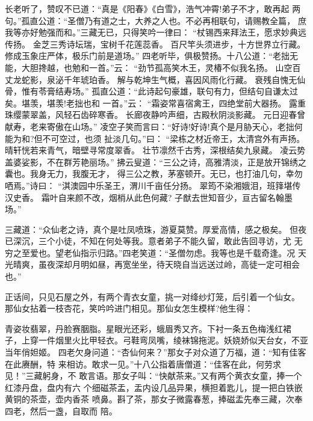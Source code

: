 长老听了，赞叹不已道：“真是《阳春》《白雪》，浩气冲霄!弟子不才，敢再起
两句。”孤直公道：“圣僧乃有道之士，大养之人也。不必再相联句，请赐教全篇，
庶我等亦好勉强而和。”三藏无已，只得笑吟一律曰：
“杖锡西来拜法王，愿求妙典远传扬。
金芝三秀诗坛瑞，宝树千花莲蕊香。
百尺竿头须进步，十方世界立行藏。
修成玉象庄严体，极乐门前是道场。”
四老听毕，俱极赞扬。十八公道：“老拙无能，大胆搀越，也勉和一首。”云：
“劲节孤高笑木王，灵椿不似我名扬。
山空百丈龙蛇影，泉泌千年琥珀香。
解与乾坤生气概，喜因风雨化行藏。
衰残自愧无仙骨，惟有苓膏结寿场。”
孤直公道：“此诗起句豪雄，联句有力，但结句自谦太过矣。堪羡，堪羡!老拙也和
一首。”云：
“霜姿常喜宿禽王，四绝堂前大器扬。
露重珠缨蒙翠盖，风轻石齿碎寒香。
长廊夜静吟声细，古殿秋阴淡影藏。
元日迎春曾献寿，老来寄傲在山场。”
凌空子笑而言曰：“好诗!好诗!真个是月胁天心，老拙何能为和?但不可空过，也须
扯淡几句。”曰：
“梁栋之材近帝王，太清宫外有声扬。
晴轩恍若来青气，暗壁寻常度翠香。
壮节凛然千古秀，深根结矣九泉藏。
凌云势盖婆娑影，不在群芳艳丽场。”
拂云叟道：“三公之诗，高雅清淡，正是放开锦绣之囊也。我身无力，我腹无才，
得三公之教，茅塞顿开。无已，也打油几句，幸勿哂焉。”诗曰：
“淇澳园中乐圣王，渭川千亩任分扬。
翠筠不染湘娥泪，班箨堪传汉史香。
霜叶自来颜不改，烟梢从此色何藏?
子猷去世知音少，亘古留名翰墨场。”

三藏道：“众仙老之诗，真个是吐凤喷珠，游夏莫赞。厚爱高情，感之极矣。
但夜已深沉，三个小徒，不知在何处等我。意者弟子不能久留，敢此告回寻访，尤
无穷之至爱也。望老仙指示归路。”四老笑道：“圣僧勿虑。我等也是千载奇逢。况
天光晴爽，虽夜深却月明如昼，再宽坐坐，待天晓自当远送过岭，高徒一定可相会
也。”

正话间，只见石屋之外，有两个青衣女童，挑一对绛纱灯笼，后引着一个仙女。
那仙女拈着一枝杏花，笑吟吟进门相见。那仙女怎生模样?他生得：

青姿妆翡翠，丹脸赛胭脂。星眼光还彩，蛾眉秀又齐。下衬一条五色梅浅红裙
子，上穿一件烟里火比甲轻衣。弓鞋弯凤嘴，绫袜锦拖泥。妖娆娇似天台女，不亚
当年俏妲姬。
四老欠身问道：“杏仙何来？”那女子对众道了万福，道：“知有佳客在此赓酬，特
来相访。敢求一见。”十八公指着唐僧道：“佳客在此，何劳求见！”三藏躬身，不
敢言语。那女子叫：“快献茶来。”又有两个黄衣女童，捧一个红漆丹盘，盘内有六
个细磁茶盂，盂内设几品异果，横担着匙儿，提一把白铁嵌黄铜的茶壶，壶内香茶
喷鼻。斟了茶，那女子微露春葱，捧磁盂先奉三藏，次奉四老，然后一盏，自取而
陪。

